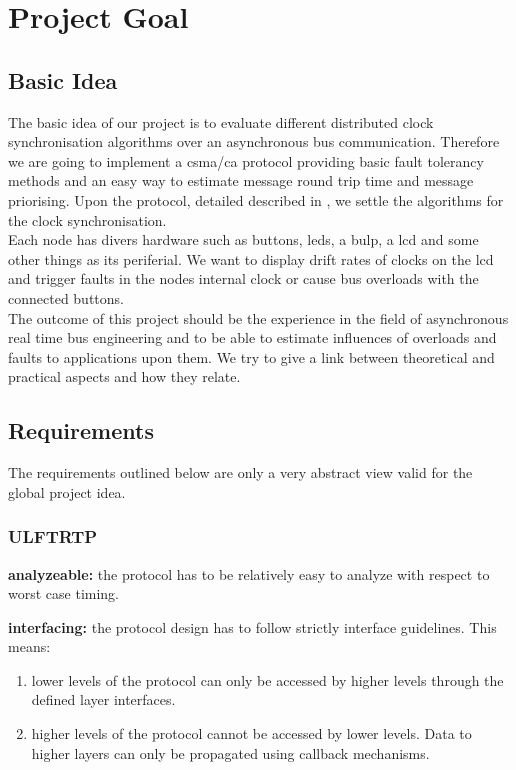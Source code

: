 \section{Project Goal}

\subsection{Basic Idea}
The basic idea of our project is to evaluate different distributed clock synchronisation algorithms over an asynchronous bus communication. Therefore we are going to implement a csma/ca protocol providing basic fault tolerancy methods and an easy way to estimate message round trip time and message priorising.
Upon the protocol, detailed described in \cite[NESD2]{NESD2}, we settle the algorithms for the clock synchronisation.\\

Each node has divers hardware such as buttons, leds, a bulp, a lcd and some other things as its periferial. We want to display drift rates of clocks on the lcd and trigger faults in the nodes internal clock or cause bus overloads with the connected buttons.\\

The outcome of this project should be the experience in the field of asynchronous real time bus engineering and to be able to estimate influences of overloads and faults to applications upon them.
We try to give a link between theoretical and practical aspects and how they relate.

\subsection{Requirements}

The requirements outlined below are only a very abstract view valid for the global project idea.

\subsubsection{ULFTRTP}
\begin{req}
\label{req:ulftrtp:analyzeable}
\textbf{analyzeable: }the protocol has to be relatively easy to analyze with respect to worst case timing.
\end{req}

\begin{req}
\label{req:ulftrtp:interfacing}
\textbf{interfacing: }the protocol design has to follow strictly interface guidelines. This means:
\begin{enumerate}
 \item lower levels of the protocol can only be accessed by higher levels through the defined layer interfaces.
 \item higher levels of the protocol cannot be accessed by lower levels. Data to higher layers can only be propagated using callback mechanisms. 
\end{enumerate}

\end{req}

